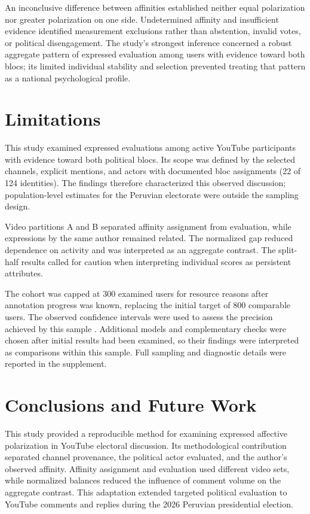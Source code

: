 \documentclass[conference, letterpaper]{IEEEtran}
\begin{document}
An inconclusive difference between affinities established neither equal polarization nor greater polarization on one side. Undetermined affinity and insufficient evidence identified measurement exclusions rather than abstention, invalid votes, or political disengagement. The study's strongest inference concerned a robust aggregate pattern of expressed evaluation among users with evidence toward both blocs; its limited individual stability and selection prevented treating that pattern as a national psychological profile.

\section{Limitations}

This study examined expressed evaluations among active YouTube participants with evidence toward both political blocs. Its scope was defined by the selected channels, explicit mentions, and actors with documented bloc assignments (22 of 124 identities). The findings therefore characterized this observed discussion; population-level estimates for the Peruvian electorate were outside the sampling design.

Video partitions A and B separated affinity assignment from evaluation, while expressions by the same author remained related. The normalized gap reduced dependence on activity and was interpreted as an aggregate contrast. The split-half results called for caution when interpreting individual scores as persistent attributes.

The cohort was capped at 300 examined users for resource reasons after annotation progress was known, replacing the initial target of 800 comparable users. The observed confidence intervals were used to assess the precision achieved by this sample \cite{lakens2022sample}. Additional models and complementary checks were chosen after initial results had been examined, so their findings were interpreted as comparisons within this sample. Full sampling and diagnostic details were reported in the supplement.

\section{Conclusions and Future Work}
This study provided a reproducible method for examining expressed affective polarization in YouTube electoral discussion. Its methodological contribution separated channel provenance, the political actor evaluated, and the author's observed affinity. Affinity assignment and evaluation used different video sets, while normalized balances reduced the influence of comment volume on the aggregate contrast. This adaptation extended targeted political evaluation to YouTube comments and replies during the 2026 Peruvian presidential election.
\end{document}
